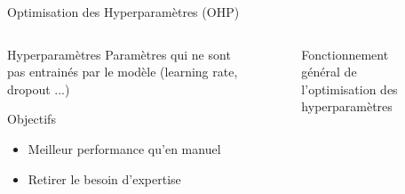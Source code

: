 \begin{frame}{Optimisation des Hyperparamètres (OHP)}
   \begin{columns}
         
       \begin{column}[t]{0.3\textwidth} 
       \begin{block}{Hyperparamètres}
         Paramètres qui ne sont pas entrainés par le modèle (learning rate, dropout ...)           
       \end{block}
       \begin{block}{Objectifs}
        \begin{itemize}
            \item Meilleur performance qu'en manuel
            \item Retirer le besoin d'expertise
        \end{itemize}
        
       \end{block}

       \end{column}
           
       \begin{column}[t]{0.8\textwidth}
        \begin{figure}
            \centering
            
            \caption{Fonctionnement général de l'optimisation des hyperparamètres}
       \end{figure}  
       \end{column}
            
   \end{columns}

   

\end{frame}


